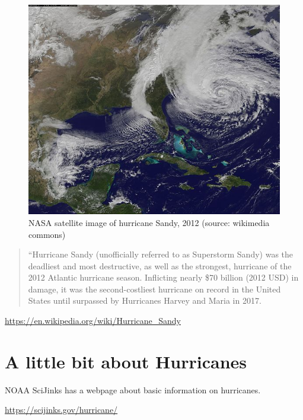 \documentclass[
]{book}
\begin{document}
\begin{figure}

{\centering \includegraphics[width=0.8\linewidth]{images/sandy-hurricane} 

}

\caption{NASA satellite image of hurricane Sandy, 2012 (source: wikimedia commons)}\label{fig:unnamed-chunk-2}
\end{figure}

\begin{quote}
``Hurricane Sandy (unofficially referred to as Superstorm Sandy) was the
deadliest and most destructive, as well as the strongest, hurricane of the
2012 Atlantic hurricane season. Inflicting nearly \$70 billion (2012 USD) in
damage, it was the second-costliest hurricane on record in the United States
until surpassed by Hurricanes Harvey and Maria in 2017.
\end{quote}

\url{https://en.wikipedia.org/wiki/Hurricane_Sandy}

\hypertarget{a-little-bit-about-hurricanes}{%
\section{A little bit about Hurricanes}\label{a-little-bit-about-hurricanes}}

NOAA SciJinks has a webpage about basic information on hurricanes.

\url{https://scijinks.gov/hurricane/}
\end{document}
